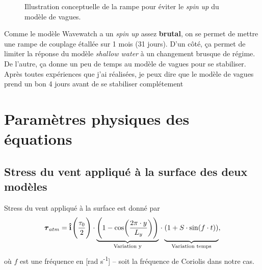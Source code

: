 \documentclass[10pt]{report}
\numberwithin{equation}{section}
\newcommand{\ivf}{\vb{\hat{i}}}
\newcommand{\venti}{\vphantom{\sum_x^x}}
\newcommand{\pt}{\hspace{1pt}} %
\begin{document}
\begin{figure}
\begin{center}
\end{center}
\caption{\label{org38287a4}Illustration conceptuelle de la rampe pour éviter le \emph{spin up} du modèle de vagues.}
\end{figure}

Comme le modèle Wavewatch a un \emph{spin up} assez \textbf{brutal}, on se permet de mettre une rampe de couplage étallée sur 1 mois (31 jours).
D'un côté, ça permet de limiter la réponse du modèle \emph{shallow water} à un changement brusque de régime.
De l'autre, ça donne un peu de temps au modèle de vagues pour se stabiliser.
Après toutes expériences que j'ai réalisées, je peux dire que le modèle de vagues prend un bon 4 jours avant de se stabiliser complétement
\chapter{Paramètres physiques des équations}
\label{sec:org898f3f6}

\section{Stress du vent appliqué à la surface des deux modèles}
\label{sec:orgb8b72bf}
\label{orgb4c6ff9}
Stress du vent appliqué à la surface est donné par
\begin{equation}
\label{eq:org5e8a664}
   \boldsymbol{\tau}_{atm} = \ivf\pt\qty(\venti\frac{\tau_0}{2})\cdot\underbrace{\qty(\venti1-\cos(\frac{2\pi\cdot y}{L_y}))\venti}_\text{Variation y} \pt\cdot\pt \underbrace{\venti\qty(1+S\cdot\sin(f\cdot t))}_\text{Variation temps},
\end{equation}
où \(f\) est une fréquence en [rad s\textsuperscript{-1}] -- soit la fréquence de Coriolis dans notre cas.\bigskip
\end{document}
